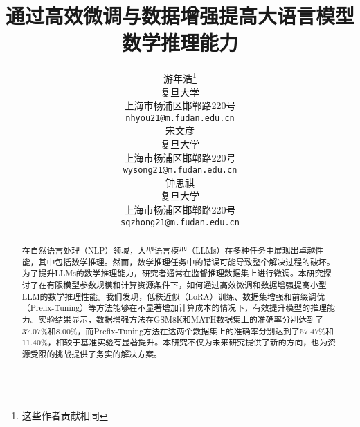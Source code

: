 \documentclass{article}
\title{通过高效微调与数据增强提高大语言模型数学推理能力}
\author{%
  游年浩\thanks{这些作者贡献相同}\\
  复旦大学 \\
  上海市杨浦区邯郸路220号 \\
  \texttt{nhyou21@m.fudan.edu.cn} \\
  \And
  宋文彦\footnotemark[1]\\
  复旦大学 \\
  上海市杨浦区邯郸路220号 \\
  \texttt{wysong21@m.fudan.edu.cn} \\
  \And
  钟思祺\footnotemark[1]\\ 
  复旦大学 \\
  上海市杨浦区邯郸路220号 \\
  \texttt{sqzhong21@m.fudan.edu.cn} \\
}
\begin{document}
\maketitle


\begin{abstract}
  在自然语言处理（NLP）领域，大型语言模型（LLMs）在多种任务中展现出卓越性能，其中包括数学推理。然而，数学推理任务中的错误可能导致整个解决过程的破坏。为了提升LLMs的数学推理能力，研究者通常在监督推理数据集上进行微调。本研究探讨了在有限模型参数规模和计算资源条件下，如何通过高效微调和数据增强提高小型LLM的数学推理性能。我们发现，低秩近似（LoRA）训练、数据集增强和前缀调优（Prefix-Tuning）等方法能够在不显著增加计算成本的情况下，有效提升模型的推理能力。实验结果显示，数据增强方法在GSM8K和MATH数据集上的准确率分别达到了37.07\%和8.00\%，而Prefix-Tuning方法在这两个数据集上的准确率分别达到了57.47\%和11.40\%，相较于基准实验有显著提升。本研究不仅为未来研究提供了新的方向，也为资源受限的挑战提供了务实的解决方案。
\end{abstract}












\appendix

\end{document}
